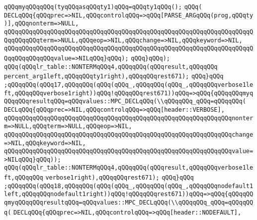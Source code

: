 \verb|qQQqmyqQQqqQQq(tyqQQqasqQQqty1)qQQq=qQQqty1qQQq();|\newline
\verb|qQQq(|\newline
\verb|DECLqQQq{qQQqprec=>NIL,qQQqcontrolqQQq=>qQQq[PARSE_ARGqQQq(prog,qQQqty)],qQQqnonterm=>NULL,|\newline
\verb|qQQqqQQqqQQqqQQqqQQqqQQqqQQqqQQqqQQqqQQqqQQqqQQqqQQqqQQqqQQqqQQqqQQqqQQqqQQqqQQqterm=>NULL,qQQqeop=>NIL,qQQqchange=>NIL,qQQqkeyword=>NIL,|\newline
\verb|qQQqqQQqqQQqqQQqqQQqqQQqqQQqqQQqqQQqqQQqqQQqqQQqqQQqqQQqqQQqqQQqqQQqqQQqqQQqqQQqqQQqvalue=>NILqQQq}qQQq);|\newline
\verb|qQQq}qQQq);|\newline
\verb|qQQq(qQQqlr_table::NONTERMqQQq4,qQQqqQQq(qQQqresult,qQQqqQQq|\newline
\verb|percent_arg1left,qQQqqQQqty1right),qQQqqQQqrest671);|\newline
\verb|qQQq}qQQq|\newline
\verb|;qQQqqQQq(qQQq17,qQQqqQQq(qQQq(qQQq_,qQQqqQQq(qQQq_,qQQqqQQqverbose1left,qQQqqQQqverbose1right))qQQq!qQQqqQQqrest671))qQQq=>qQQq{qQQqqQQqmyqQQqqQQqresultqQQq=qQQqvalues::MPC_DECLqQQq(\\qQQqqQQq_qQQq=qQQqqQQq(|\newline
\verb|DECLqQQq{qQQqprec=>NIL,qQQqcontrolqQQq=>qQQq[header::VERBOSE],|\newline
\verb|qQQqqQQqqQQqqQQqqQQqqQQqqQQqqQQqqQQqqQQqqQQqqQQqqQQqqQQqqQQqqQQqnonterm=>NULL,qQQqterm=>NULL,qQQqeop=>NIL,|\newline
\verb|qQQqqQQqqQQqqQQqqQQqqQQqqQQqqQQqqQQqqQQqqQQqqQQqqQQqqQQqqQQqqQQqchange=>NIL,qQQqkeyword=>NIL,|\newline
\verb|qQQqqQQqqQQqqQQqqQQqqQQqqQQqqQQqqQQqqQQqqQQqqQQqqQQqqQQqqQQqqQQqvalue=>NILqQQq}qQQq));|\newline
\verb|qQQq(qQQqlr_table::NONTERMqQQq4,qQQqqQQq(qQQqresult,qQQqqQQqverbose1left,qQQqqQQq|\newline
\verb|verbose1right),qQQqqQQqrest671);|\newline
\verb|qQQq}qQQq|\newline
\verb|;qQQqqQQq(qQQq18,qQQqqQQq(qQQq(qQQq_,qQQqqQQq(qQQq_,qQQqqQQqnodefault1left,qQQqqQQqnodefault1right))qQQq!qQQqqQQqrest671))qQQq=>qQQq{qQQqqQQqmyqQQqqQQqresultqQQq=qQQqvalues::MPC_DECLqQQq(\\qQQqqQQq_qQQq=qQQqqQQq(|\newline
\verb|DECLqQQq{qQQqprec=>NIL,qQQqcontrolqQQq=>qQQq[header::NODEFAULT],|\newline
